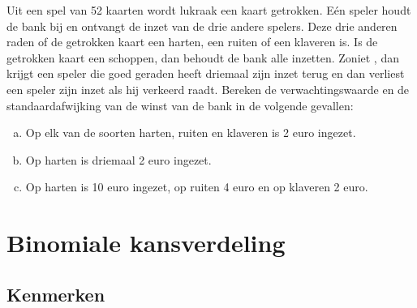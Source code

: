 \documentclass[12pt,twoside]{article}
\begin{document}
\begin{oefening}
Uit een spel van 52 kaarten wordt lukraak een kaart getrokken. Eén speler houdt de bank bij en ontvangt de inzet van de drie andere spelers. Deze drie anderen raden of de getrokken kaart een harten, een ruiten of een klaveren is. Is de getrokken kaart een schoppen, dan behoudt de bank alle inzetten. Zoniet , dan krijgt een speler die goed geraden heeft driemaal zijn inzet terug en dan verliest een speler zijn inzet als hij verkeerd raadt. Bereken de verwachtingswaarde en de standaardafwijking van de winst van de bank in de volgende gevallen:

\begin{enumerate}[(a)]
  \item Op elk van de soorten harten, ruiten en klaveren is 2 euro ingezet.
  \item Op harten is driemaal 2 euro ingezet.
  \item Op harten is 10 euro ingezet, op ruiten 4 euro en op klaveren 2 euro.
\end{enumerate}
\end{oefening}



\pagebreak
\section{Binomiale kansverdeling}

\subsection{Kenmerken}
\end{document}
